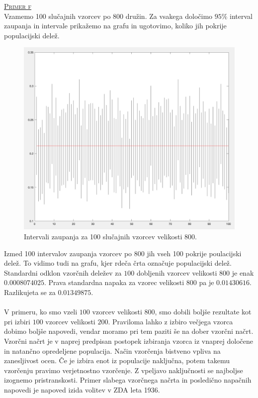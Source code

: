 \documentclass[a4paper,12pt]{article}
\begin{document}
\noindent
\textsc{\underline{Primer f}}
\\
Vzamemo 100 slučajnih vzorcev po 800 družin. Za vsakega določimo $95 \%$ interval zaupanja in intervale prikažemo na grafu in ugotovimo, koliko jih pokrije populacijski delež. 
\begin{figure}[ht!]
    \centering
    \includegraphics[width=120mm]{CI_800.png}
    \caption{Intervali zaupanja za 100 slučajnih vzorcev velikosti 800.}
\end{figure}

\noindent
Izmed 100 intervalov zaupanja vzorcev po 800 jih vseh 100 pokrije poulacijski delež. To vidimo tudi na grafu, kjer rdeča črta označuje populacijski delež.
\\
Standardni odklon vzorčnih deležev za $100$ dobljenih vzorcev velikosti $800$ je enak $0.0008074025$. Prava standardna napaka za vzorec velikosti $800$ pa je $0.01430616$.
Razlikujeta se za $0.01349875$.
\\
\\
V primeru, ko smo vzeli $100$ vzorcev velikosti $800$, smo dobili boljše rezultate kot pri izbiri $100$ vzorcev velikosti $200$. 
Praviloma lahko z izbiro večjega vzorca dobimo boljše napovedi, vendar moramo pri tem paziti še na dober vzorčni načrt. Vzorčni načrt je v naprej predpisan postopek izbiranja vzorca iz vnaprej določene in natančno opredeljene populacija. 
Način vzorčenja bistveno vpliva na zanesljivost ocen. Če je izbira enot iz populacije naključna, potem takemu vzorčenju pravimo verjetnostno vzorčenje. Z vpeljavo naključnosti se najboljse izognemo pristranskosti.
Primer slabega vzorčnega načrta in posledično napačnih napovedi je napoved izida volitev v ZDA leta 1936. 
\\
\end{document}
